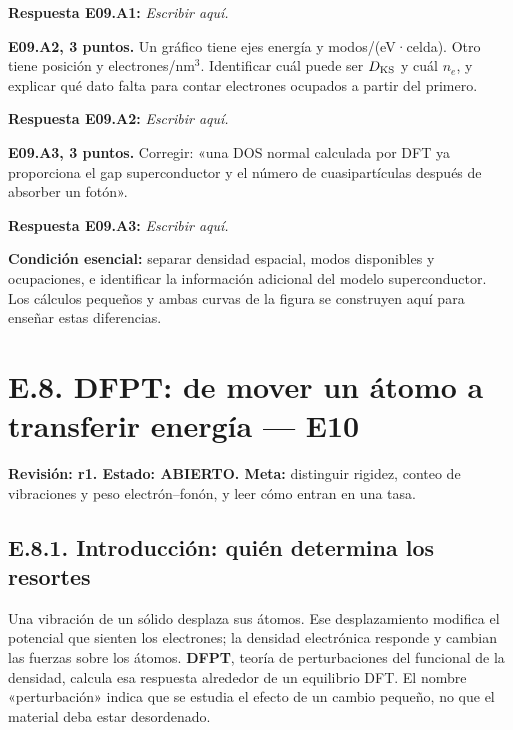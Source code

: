 \documentclass[
  spanish,
  10pt,
  a4paper,
]{article}
\begin{document}
\textbf{Respuesta E09.A1:} \emph{Escribir aquí.}


\textbf{E09.A2, 3 puntos.} Un gráfico tiene ejes energía y
modos/(eV·celda). Otro tiene posición y electrones/nm\(^3\). Identificar
cuál puede ser \(D_{\rm KS}\) y cuál \(n_e\), y explicar qué dato falta
para contar electrones ocupados a partir del primero.

\textbf{Respuesta E09.A2:} \emph{Escribir aquí.}


\textbf{E09.A3, 3 puntos.} Corregir: «una DOS normal calculada por DFT
ya proporciona el gap superconductor y el número de cuasipartículas
después de absorber un fotón».

\textbf{Respuesta E09.A3:} \emph{Escribir aquí.}

\textbf{Condición esencial:} separar densidad espacial, modos
disponibles y ocupaciones, e identificar la información adicional del
modelo superconductor. Los cálculos pequeños y ambas curvas de la figura
se construyen aquí para enseñar estas diferencias.


\bigskip

\section{E.8. DFPT: de mover un átomo a transferir energía ---
E10}\label{e.8.-dfpt-de-mover-un-uxe1tomo-a-transferir-energuxeda-e10}

\textbf{Revisión: r1. Estado: ABIERTO. Meta:} distinguir rigidez, conteo
de vibraciones y peso electrón--fonón, y leer cómo entran en una tasa.

\subsection{E.8.1. Introducción: quién determina los
resortes}\label{e.8.1.-introducciuxf3n-quiuxe9n-determina-los-resortes}

Una vibración de un sólido desplaza sus átomos. Ese desplazamiento
modifica el potencial que sienten los electrones; la densidad
electrónica responde y cambian las fuerzas sobre los átomos.
\textbf{DFPT}, teoría de perturbaciones del funcional de la densidad,
calcula esa respuesta alrededor de un equilibrio DFT. El nombre
«perturbación» indica que se estudia el efecto de un cambio pequeño, no
que el material deba estar desordenado.
\end{document}
